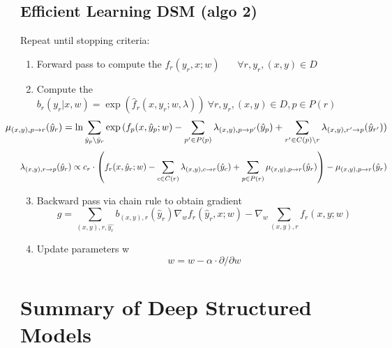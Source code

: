 \documentclass{beamer}
\begin{document}
\subsection*{Efficient Learning DSM (algo 2)}
	\begin{frame}
		
		\begin{tcolorbox}[colback=white!2, colframe=gray!90, title=Efficient Deep Structured Learning (algo 2)]
			{\footnotesize
			Repeat until stopping criteria:
			\begin{enumerate}
				\setlength{\itemindent}{-2em}
				\item Forward pass to compute the $f_r(y_r , x; w)~~~~~~~~\forall r, y_r, (x, y) \in D$
				\item Compute the $b_r(y_r | x, w) = \exp(\hat{f}_r(x, y_r; w, \lambda))~\forall r, y_r, (x, y) \in D, p \in P(r)$
				{\tiny
				$$
				\hspace{-1.2cm}
				\mu_{(x, y), p \rightarrow r} (\hat{y}_r) = \ln{
					\sum_{
						\hat{y}_p \setminus \hat{y}_r}
					{\exp{
							(
							f_p(x, \hat{y}_p; w) - 
							\sum_{p' \in P(p)} \lambda_{(x, y),  p \rightarrow p'}(\hat{y}_p) + 
							\sum_{r' \in C(p) \setminus r} \lambda_{(x, y),  r' \rightarrow p}(\hat{y}_{r'}) 
							)
						}}}
				$$
				$$
					\hspace{-0.7cm}
						\lambda_{(x, y), r \rightarrow p}(\hat{y}_r) \propto 
						c_r \cdot
						\left(
						f_r(x, \hat{y}_r; w) - 
						\sum_{c \in C(r)}{\lambda_{(x, y), c \rightarrow r}(\hat{y}_c)} + 
						\sum_{p \in P(r)}{\mu_{(x, y), p \rightarrow r}(\hat{y}_r)}
						\right)
						- \mu_{(x, y), p \rightarrow r} (\hat{y}_r)
				$$}
				
				\item Backward pass via chain rule to obtain gradient
				$$g = \sum_{(x, y), r, \hat{y_r}} b_{(x, y), r}(\hat{y}_r) \nabla_w  f_r(\hat{y}_r , x; w) - \nabla_w \sum_{(x, y), r} f_r(x, y;w)$$ 
				\item Update parameters w 
				$$w = w  - \alpha \cdot \partial/\partial w$$
			\end{enumerate}
			}
		\end{tcolorbox}
		
	\end{frame}


\section*{Summary of Deep Structured Models}
\end{document}
